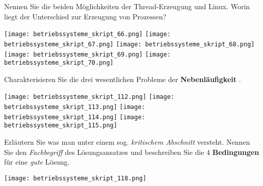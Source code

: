 \documentclass{article}
\begin{document}
\begin{tcolorbox}[colback=white!10!white,colframe=lightgray!75!black,
  savelowerto=\jobname_ex.tex,breakable,enhanced,lines before break=40]

\begin{center}
Nennen Sie die beiden Möglichkeiten der Thread-Erzeugung und Linux. 
Worin liegt der Unterschied zur Erzeugung von Prozessen?

\end{center}

\tcblower

\justifying
\texttt{[image: betriebssysteme\_skript\_66.png]}
\texttt{[image: betriebssysteme\_skript\_67.png]}
\texttt{[image: betriebssysteme\_skript\_68.png]}
\texttt{[image: betriebssysteme\_skript\_69.png]}
\texttt{[image: betriebssysteme\_skript\_70.png]}

\end{tcolorbox}
\begin{tcolorbox}[colback=white!10!white,colframe=lightgray!75!black,
  savelowerto=\jobname_ex.tex,breakable,enhanced,lines before break=40]

\begin{center}
Charakterisieren Sie die drei wesentlichen Probleme der 
\textbf{Nebenläufigkeit
}.

\end{center}

\tcblower

\justifying
\texttt{[image: betriebssysteme\_skript\_112.png]}
\texttt{[image: betriebssysteme\_skript\_113.png]}
\texttt{[image: betriebssysteme\_skript\_114.png]}
\texttt{[image: betriebssysteme\_skript\_115.png]}

\end{tcolorbox}
\begin{tcolorbox}[colback=white!10!white,colframe=lightgray!75!black,
  savelowerto=\jobname_ex.tex,breakable,enhanced,lines before break=40]

\begin{center}
Erläutern Sie was man unter einem sog. 
\textit{kritischem Abschnitt
} versteht. Nennen Sie den 
\textit{Fachbegriff
} des Lösungsansatzes und beschreiben Sie die 4 
\textbf{Bedingungen
} für eine 
\textit{gute
} Lösung.

\end{center}

\tcblower

\justifying
\texttt{[image: betriebssysteme\_skript\_118.png]}

\end{tcolorbox}
\end{document}
